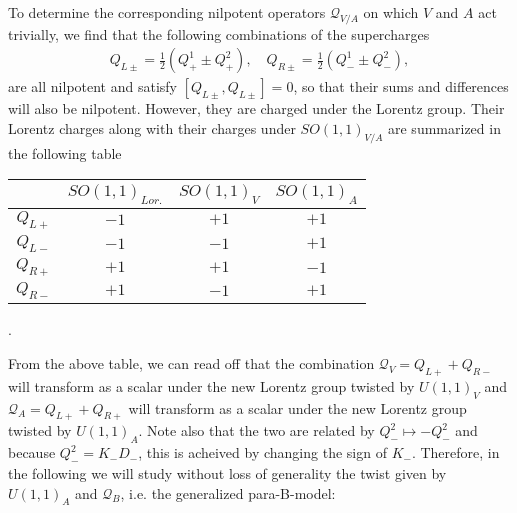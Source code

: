 \documentclass{article}
\newcommand{\QQ}{\mathcal{Q}}
\theoremstyle{definition}
\theoremstyle{remark}
\begin{document}
To determine the corresponding nilpotent operators $\QQ_{V/A}$ on which $V$ and $A$ act trivially, we find that the following combinations of the supercharges
\begin{align*}
Q_{L\pm}=\frac{1}{2}(Q^1_+\pm Q^2_+),\quad Q_{R\pm}=\frac{1}{2}(Q^1_-\pm Q^2_-),
\end{align*}
are all nilpotent and satisfy $[Q_{L\pm},Q_{L\pm}]=0$, so that their sums and differences will also be nilpotent. However, they are charged under the Lorentz group. Their Lorentz charges along with their charges under $SO(1,1)_{V/A}$ are summarized in the following table
\bigskip
\begin{center}
\begin{tabular}{c|c c c}
		& $SO(1,1)_{Lor.}$ & $SO(1,1)_V$ & $SO(1,1)_A$\\ \hline
$Q_{L+}$& $-1$ & $+1$ & $+1$\\
$Q_{L-}$& $-1$ & $-1$ & $+1$\\
$Q_{R+}$& $+1$ & $+1$ & $-1$\\
$Q_{R-}$& $+1$ & $-1$ & $+1$
\end{tabular}.
\end{center}
\bigskip
From the above table, we can read off that the combination $\QQ_V=Q_{L+}+Q_{R-}$ will transform as a scalar under the new Lorentz group twisted by $U(1,1)_V$ and $\QQ_A=Q_{L+}+Q_{R+}$ will transform as a scalar under the new Lorentz group twisted by $U(1,1)_A$. Note also that the two are related by $Q_-^2\mapsto -Q_-^2$ and because $Q_-^2=K_-D_-$, this is acheived by changing the sign of $K_-$. Therefore, in the following we will study without loss of generality the twist given by $U(1,1)_A$ and $\QQ_B$, i.e. the generalized para-B-model:
\end{document}
